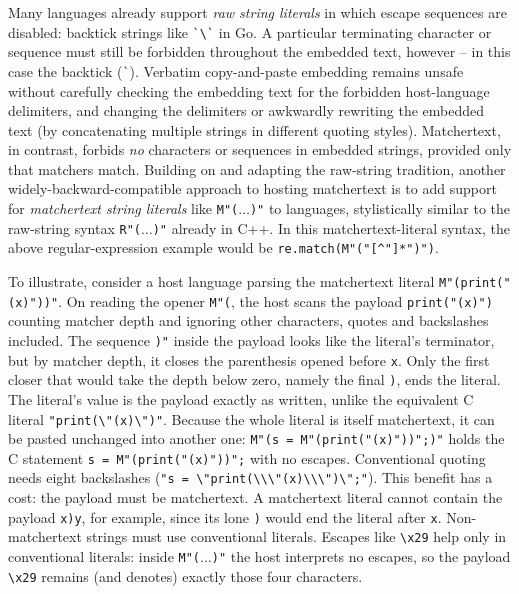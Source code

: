 Many languages already support \emph{raw string literals}
in which escape sequences are disabled:
\eg backtick strings like \verb|`\`| in Go.
A particular terminating character or sequence
must still be forbidden throughout the embedded text,
however -- in this case the backtick (\verb|`|).
Verbatim copy-and-paste embedding remains unsafe
without carefully checking the embedding text
for the forbidden host-language delimiters,
and changing the delimiters or awkwardly rewriting the embedded text
(\eg by concatenating multiple strings in different quoting styles).
Matchertext, in contrast, forbids \emph{no} characters or sequences
in embedded strings,
provided only that matchers match.
Building on and adapting the raw-string tradition,
another widely-backward-compatible approach to hosting matchertext
is to add support for \emph{matchertext string literals}
like \verb|M"(|$\dots$\verb|)"| to languages,
stylistically similar to the raw-string syntax \verb|R"(|$\dots$\verb|)"| 
already in C++.
In this matchertext-literal syntax,
the above regular-expression example
would be \verb|re.match(M"("[^"]*")")|.

To illustrate,
consider a host language parsing
the matchertext literal \verb|M"(print("(x)"))"|.
On reading the opener \verb|M"(|, the host scans the payload
\verb|print("(x)")|
counting matcher depth and ignoring other characters,
quotes and backslashes included.
The sequence \verb|)"| inside the payload looks like the literal's terminator,
but by matcher depth,
it closes the parenthesis opened before \verb|x|.
Only the first closer that would take the depth below zero,
namely the final \verb|)|, ends the literal.
The literal's value is the payload exactly as written,
unlike the equivalent C literal
\verb|"print(\"(x)\")"|.
Because the whole literal is itself matchertext,
it can be pasted unchanged into another one:
\verb|M"(s = M"(print("(x)"))";)"|
holds the C statement \verb|s = M"(print("(x)"))";|
with no escapes.
Conventional quoting needs eight backslashes
(\verb|"s = \"print(\\\"(x)\\\")\";"|).
This benefit has a cost:
the payload must be matchertext.
A matchertext literal cannot contain the payload \verb|x)y|, for example,
since its lone \verb|)| would end the literal after \verb|x|.
Non-matchertext strings must use conventional literals.
Escapes like \verb|\x29| help only in conventional literals:
inside \verb|M"(|$\dots$\verb|)"| the host interprets no escapes,
so the payload \verb|\x29| remains (and denotes) exactly those four characters.

